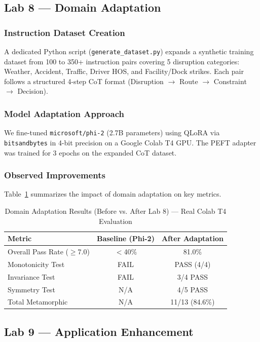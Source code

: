 \documentclass[11pt,letterpaper]{article}
\begin{document}
\subsection{Lab 8 --- Domain Adaptation}

\subsubsection{Instruction Dataset Creation}
A dedicated Python script (\texttt{generate\_dataset.py}) expands a synthetic training dataset from 100 to 350+ instruction pairs covering 5 disruption categories: Weather, Accident, Traffic, Driver HOS, and Facility/Dock strikes. Each pair follows a structured 4-step CoT format (Disruption $\rightarrow$ Route $\rightarrow$ Constraint $\rightarrow$ Decision).

\subsubsection{Model Adaptation Approach}
We fine-tuned \texttt{microsoft/phi-2} (2.7B parameters) using QLoRA via \texttt{bitsandbytes} in 4-bit precision on a Google Colab T4 GPU. The PEFT adapter was trained for 3 epochs on the expanded CoT dataset.

\subsubsection{Observed Improvements}
Table~\ref{tab:adaptation} summarizes the impact of domain adaptation on key metrics.

\begin{table}[H]
\centering
\caption{Domain Adaptation Results (Before vs. After Lab 8) --- Real Colab T4 Evaluation}
\label{tab:adaptation}
\begin{tabular}{lcc}
\toprule
\textbf{Metric} & \textbf{Baseline (Phi-2)} & \textbf{After Adaptation} \\
\midrule
Overall Pass Rate ($\geq$7.0) & $<$40\% & 81.0\% \\
Monotonicity Test & FAIL & PASS (4/4) \\
Invariance Test & FAIL & 3/4 PASS \\
Symmetry Test & N/A & 4/5 PASS \\
Total Metamorphic & N/A & 11/13 (84.6\%) \\
\bottomrule
\end{tabular}
\end{table}

\subsection{Lab 9 --- Application Enhancement}
\end{document}
